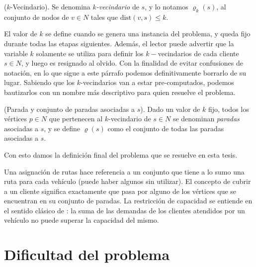 \begin{definition}
    ($k$-Vecindario).
    Se denomina \emph{$k$-vecindario} de $s$, y lo notamos $\varrho_k(s)$, al conjunto de nodos de $v \in N$ tales que $\text{dist}(v, s) \leq k$.
\end{definition}

El valor de $k$ se define cuando se genera una instancia del problema, y queda fijo durante todas las etapas siguientes. Además, el lector puede advertir que la variable $k$ solamente se utiliza para definir los $k-$vecindarios de cada cliente $s \in N$, y luego es resignado al olvido. Con la finalidad de evitar confusiones de notación, en lo que sigue a este párrafo podemos definitivamente borrarlo de su lugar. Sabiendo que los $k$-vecindarios van a estar pre-computados, podemos bautizarlos con un nombre más descriptivo para quien resuelve el problema. 

\begin{definition}
    (Parada y conjunto de paradas asociadas a $s$).
    Dado un valor de $k$ fijo, todos los vértices $p \in N$ que pertenecen al $k$-vecindario de $s \in N$ se denominan \emph{paradas} asociadas a $s$, y se define $\varrho(s)$ como el conjunto de todas las paradas asociadas a $s$. 
\end{definition}

Con esto damos la definición final del problema que se resuelve en esta tesis.

\label{star-vrp}

Una asignación de rutas hace referencia a un conjunto que tiene a lo sumo una ruta para cada vehículo (puede haber algunos sin utilizar). El concepto de cubrir a un cliente significa exactamente que pasa por alguno de los vértices que se encuentran en su conjunto de paradas. La restricción de capacidad se entiende en el sentido clásico de : la suma de las demandas de los clientes atendidos por un vehículo no puede superar la capacidad del mismo. 

\section{Dificultad del problema}
\label{section:complexity}

